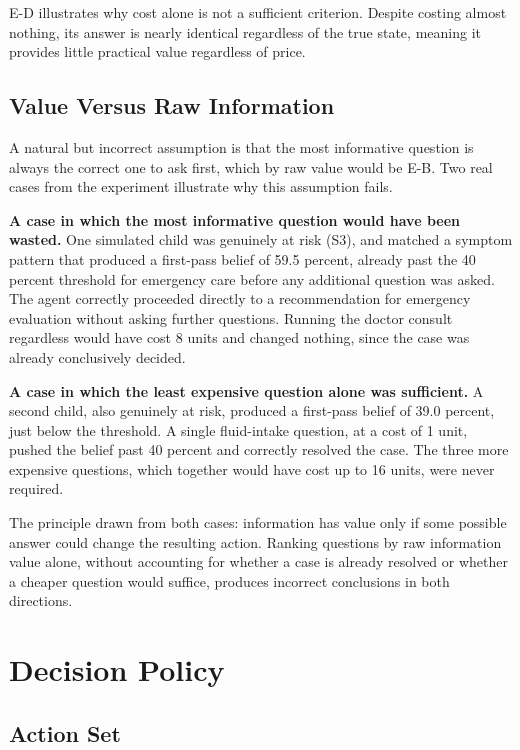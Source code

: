 \documentclass{article}
\begin{document}
E-D illustrates why cost alone is not a sufficient criterion. Despite
costing almost nothing, its answer is nearly identical regardless of the
true state, meaning it provides little practical value regardless of
price.

\hypertarget{value-versus-raw-information}{%
\subsection{Value Versus Raw
Information}\label{value-versus-raw-information}}

A natural but incorrect assumption is that the most informative question
is always the correct one to ask first, which by raw value would be E-B.
Two real cases from the experiment illustrate why this assumption fails.

\textbf{A case in which the most informative question would have been
wasted.} One simulated child was genuinely at risk (S3), and matched a
symptom pattern that produced a first-pass belief of 59.5 percent,
already past the 40 percent threshold for emergency care before any
additional question was asked. The agent correctly proceeded directly to
a recommendation for emergency evaluation without asking further
questions. Running the doctor consult regardless would have cost 8 units
and changed nothing, since the case was already conclusively decided.

\textbf{A case in which the least expensive question alone was
sufficient.} A second child, also genuinely at risk, produced a
first-pass belief of 39.0 percent, just below the threshold. A single
fluid-intake question, at a cost of 1 unit, pushed the belief past 40
percent and correctly resolved the case. The three more expensive
questions, which together would have cost up to 16 units, were never
required.

The principle drawn from both cases: information has value only if some
possible answer could change the resulting action. Ranking questions by
raw information value alone, without accounting for whether a case is
already resolved or whether a cheaper question would suffice, produces
incorrect conclusions in both directions.

\hypertarget{decision-policy}{%
\section{Decision Policy}\label{decision-policy}}

\hypertarget{action-set}{%
\subsection{Action Set}\label{action-set}}
\end{document}
